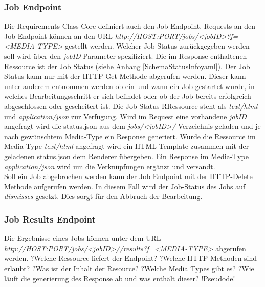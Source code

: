 \subsubsection{Job Endpoint}
Die Requirements-Class Core definiert auch den Job Endpoint.
Requests an den Job Endpoint können an den URL \textit{http://HOST:PORT/jobs/<jobID>?f=<MEDIA-TYPE>} gestellt werden. 
Welcher Job Status zurückgegeben werden soll wird über den \textit{jobID}-Parameter spezifiziert. 
Die im Response enthaltenen Ressource ist der Job Status (siehe Anhang \ref{SchemaStatusInfoyaml}). Der Job Status kann nur mit der HTTP-Get Methode abgerufen werden. 
Dieser kann unter anderem entnommen werden 
ob ein und wann ein Job gestartet wurde, in welches Bearbeitungsschritt er sich befindet oder ob der Job bereits erfolgreich abgeschlossen 
oder gescheitert ist. Die Job Status RRessource steht als \textit{text/html} und \textit{application/json} zur Verfügung. 
Wird im Request eine vorhandene \textit{jobID} angefragt wird die status.json aus dem \textit{jobs/<jobID>/} Verzeichnis geladen und je nach gewünschtem Media-Type 
ein Response generiert. Wurde die Ressource im Media-Type \textit{text/html} angefragt wird ein HTML-Template zusammen mit der geladenen status.json 
dem Renderer übergeben.
Ein Response im Media-Type \textit{application/json} wird um die Verknüpfungen ergänzt und versandt. \\

Soll ein Job abgebrochen werden kann der Job Endpoint mit der HTTP-Delete Methode aufgerufen werden. In diesem Fall wird der Job-Status des Jobs auf \textit{dismisses} 
gesetzt. Dies sorgt für den Abbruch der Bearbeitung. 

\subsubsection{Job Results Endpoint}
Die Ergebnisse eines Jobs können unter dem URL \textit{http://HOST:PORT/jobs/<jobID>//results?f=<MEDIA-TYPE>} abgerufen werden. 
?Welche Ressource liefert der Endpoint?
?Welche HTTP-Methoden sind erlaubt?
?Was ist der Inhalt der Resource?
?Welche Media Types gibt es?
?Wie läuft die generierung des Response ab und was enthält dieser?
!Pseudode!

